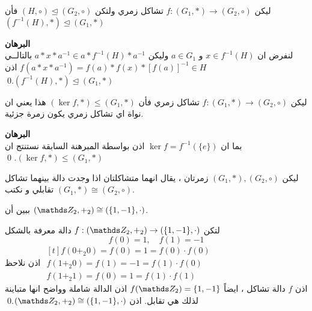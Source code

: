  \begin{theorem}
 ليكن $f : (G_1, *) \to (G_2, \circ)$ تشاكل زمري ولتكن 
 $(H, \circ) \trianglelefteq (G_2, \circ)$
 فأن 
 $(f^{-1}(H), *) \trianglelefteq (G_1, *)$
 \end{theorem}
\noindent
\textbf{البرهان}\\
\noindent
لنفرض ان $x \in f^{-1}(H)$ و $a\in G_1$ وليكن 
$a * x * a^{-1} \in a * f^{-1}(H) *a^{-1}$ بالتالــي
$f(a * x * a^{-1}) = f(a) * f(x) * [f(a)]^{-1} \in H$ اذن $(f^{-1}(H), *) \trianglelefteq (G_1, *)$.\qed
\newpage
\begin{corollary}
ليكن $f : (G_1, *) \to (G_2, \circ)$ تشاكل زمري فأن 
$(\ker f, *) \leq (G_1, *)$ 
هذا يعني ان نواة اي تشاكل زمري يكون زمرة جزئية.
\end{corollary}
\noindent
\textbf{البرهان}\\
\noindent
بما ان
$\ker f = f^{-1}(\{e\})$
اذن بواسطة المبرهنة السابقة نستنتج ان 
$(\ker f, *) \leq (G_1, *)$. \qed 

\begin{definition}
	ليكن 
	$(G_1, *) , (G_2, \circ)$ زمرتان ، يقال انهما متشاكلتان اذا وجدت دالة بينهما تشاكل تقابلي و نكتب $(G_1, *) \cong (G_2, \circ)$.
\end{definition}

\begin{example}
	ببين أن 
	$(\Z_2, +_2) \cong (\{1,-1\}, \cdot)$.
\end{example}
\begin{solution}
	لتكن 
	$f  : (\Z_2, +_2) \to (\{1,-1\}, \cdot)$  دالة معرفة بالشكل
	\[
	f(0) = 1, \quad f(1) = -1
	\]
	اذن نلاحظ
	$
	\begin{gathered}[t]
		f(0 +_2 0) = f(0) = 1 = f(0)\cdot f(0)\\
		f(1+_2 0) = f(1) = -1 = f(1) \cdot f(0)\\
		f(1 +_2 1) = f(0) = 1 = f(1) \cdot f(1)
	\end{gathered}
	$\\
	اذن $f$ دالة تشاكل ، ايضاً $f(\Z_2) = \{1,-1\}$ اذن الدالة شاملة وواضح انها متباينة لذلك هي تقابل. اذن 	$(\Z_2, +_2) \cong (\{1,-1\}, \cdot)$.\qed
\end{solution}

\newpage

